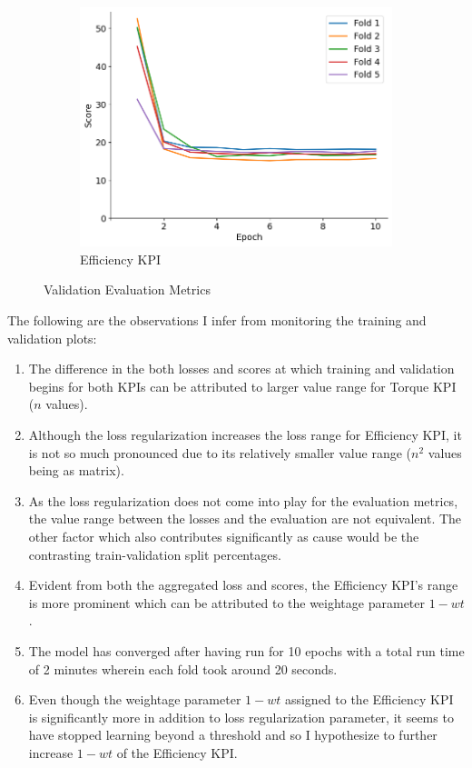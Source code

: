 \documentclass{report} %
\begin{document}
\begin{figure}[H]
    \begin{subfigure}{0.32\textwidth}
        \centering
        \includegraphics[width=\textwidth]{./ReportImages/val_score_y2.png}
        \caption{\centering Efficiency \ac{KPI}}
        \label{fig:Validation Score for Efficiency grid}
    \end{subfigure}
    \caption{Validation Evaluation Metrics}
    \label{fig:Validation Evaluation Metrics}
\end{figure} 

The following are the observations I infer from monitoring the training and validation plots:

\begin{enumerate}[nosep]
    \item The difference in the both losses and scores at which training and validation begins for both \ac{KPI}s can be attributed to larger value range for 
    Torque \ac{KPI} ($n$ values). 
    \item Although the loss regularization increases the loss range for Efficiency \ac{KPI}, it is not so much pronounced due to its relatively smaller value 
    range ($n^2$ values being as matrix).
    \item As the loss regularization does not come into play for the evaluation metrics, the value range between the losses and the evaluation are not equivalent. 
    The other factor which also contributes significantly as cause would be the contrasting train-validation split percentages.
    \item Evident from both the aggregated loss and scores, the Efficiency \ac{KPI}'s range is more prominent which can be attributed to the weightage parameter $1-wt$.
    \item The model has converged after having run for 10 epochs with a total run time of 2 minutes wherein each fold took around 20 seconds.
    \item Even though the weightage parameter $1-wt$ assigned to the Efficiency \ac{KPI} is significantly more in addition to loss regularization parameter, it seems to 
    have stopped learning beyond a threshold and so I hypothesize to further increase $1-wt$ of the Efficiency \ac{KPI}.\\
\end{enumerate}
\end{document}
